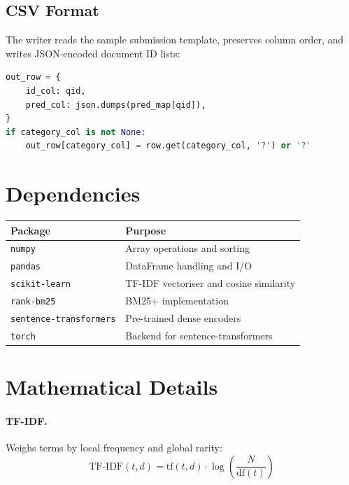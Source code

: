 \documentclass[11pt,a4paper]{article}
\begin{document}
\subsection{CSV Format}

The writer reads the sample submission template, preserves column order, and
writes JSON-encoded document ID lists:

\begin{lstlisting}[language=Python]
out_row = {
    id_col: qid,
    pred_col: json.dumps(pred_map[qid]),
}
if category_col is not None:
    out_row[category_col] = row.get(category_col, '?') or '?'
\end{lstlisting}

\section{Dependencies}

\begin{tabular}{l l}
\toprule
\textbf{Package} & \textbf{Purpose} \\
\midrule
\texttt{numpy}                & Array operations and sorting \\
\texttt{pandas}               & DataFrame handling and I/O \\
\texttt{scikit-learn}         & TF-IDF vectoriser and cosine similarity \\
\texttt{rank-bm25}            & BM25+ implementation \\
\texttt{sentence-transformers} & Pre-trained dense encoders \\
\texttt{torch}                & Backend for sentence-transformers \\
\bottomrule
\end{tabular}

\appendix
\section{Mathematical Details}

\paragraph{TF-IDF.}
Weighs terms by local frequency and global rarity:
\[
\text{TF-IDF}(t,d) = \text{tf}(t,d) \cdot \log\!\left(\frac{N}{\text{df}(t)}\right)
\]
\end{document}
